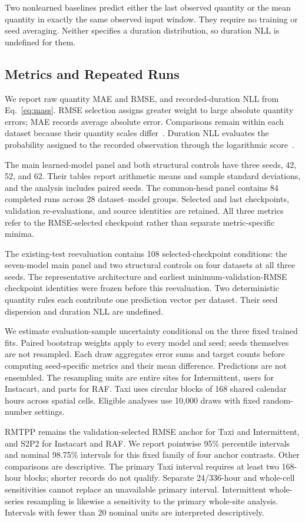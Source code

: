 \documentclass[runningheads]{llncs}
\begin{document}
Two nonlearned baselines predict either the last observed quantity or the
mean quantity in exactly the same observed input window. They require no
training or seed averaging. Neither specifies a duration distribution, so
duration NLL is undefined for them.

\subsection{Metrics and Repeated Runs}
We report raw quantity MAE and RMSE, and recorded-duration NLL from
Eq.~\eqref{eq:mass}. RMSE selection assigns greater weight to large absolute
quantity errors; MAE records average absolute error. Comparisons remain
within each dataset because their quantity scales differ~\cite{hyndman2006accuracy}.
Duration NLL evaluates the probability assigned to the recorded observation
through the logarithmic score~\cite{gneiting2007proper}.

The main learned-model panel and both structural controls have three seeds,
42, 52, and 62. Their tables report arithmetic means and sample standard
deviations, and the analysis includes paired seeds.
The common-head panel contains 84 completed runs across 28 dataset--model
groups. Selected and last checkpoints, validation re-evaluations, and source
identities are retained. All three metrics refer to the RMSE-selected
checkpoint rather than separate metric-specific minima.

The existing-test reevaluation contains 108 selected-checkpoint conditions:
the seven-model main panel and two structural controls on four datasets
at all three seeds. The representative architecture and earliest
minimum-validation-RMSE checkpoint identities were frozen before this
reevaluation. Two deterministic quantity rules each contribute one
prediction vector per dataset. Their seed dispersion and duration NLL
are undefined.

We estimate evaluation-sample uncertainty conditional on the three fixed
trained fits. Paired bootstrap weights apply to every model and seed;
seeds themselves are not resampled. Each draw aggregates error sums and
target counts before computing seed-specific metrics and their mean
difference. Predictions are not ensembled. The resampling units are entire
sites for Intermittent, users for Instacart, and parts for RAF. Taxi uses
circular blocks of 168 shared calendar hours across spatial cells.
Eligible analyses use 10,000 draws with fixed random-number settings.

RMTPP remains the validation-selected RMSE anchor for Taxi and
Intermittent, and S2P2 for Instacart and RAF. We report pointwise 95\%
percentile intervals and nominal 98.75\% intervals for this fixed family
of four anchor contrasts. Other comparisons are descriptive. The primary
Taxi interval requires at least two 168-hour blocks; shorter records do
not qualify. Separate 24/336-hour and whole-cell sensitivities cannot
replace an unavailable primary interval. Intermittent whole-series
resampling is likewise a sensitivity to the primary whole-site analysis.
Intervals with fewer than 20 nominal units are interpreted descriptively.
\end{document}
